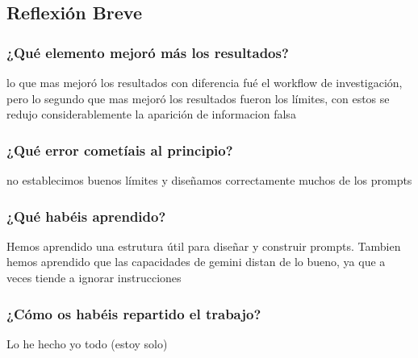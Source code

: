 \documentclass[12pt,a4paper]{article}
\begin{document}
\subsection{Reflexión Breve}
\subsubsection{¿Qué elemento mejoró más los resultados?}
lo que mas mejoró los resultados con diferencia fué el workflow de investigación, pero lo segundo que mas mejoró los resultados fueron los límites, con estos se redujo considerablemente la aparición de informacion falsa

\subsubsection{¿Qué error cometíais al principio?}

no establecimos buenos límites y diseñamos correctamente muchos de los prompts

\subsubsection{¿Qué habéis aprendido?}

Hemos aprendido una estrutura útil para diseñar y construir prompts. Tambien hemos aprendido que las capacidades de gemini distan de lo bueno, ya que a veces tiende a ignorar instrucciones

\subsubsection{¿Cómo os habéis repartido el trabajo?}

Lo he hecho yo todo (estoy solo)
\end{document}
